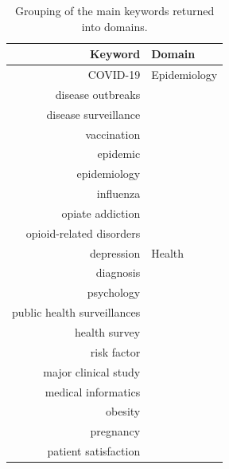 \begin{center}
    \begin{longtable}{rl}
        \caption{Grouping of the main keywords returned into domains.} \\
        Keyword                         & Domain                       \\
        \bottomrule
        COVID-19                        & Epidemiology                 \\
        disease outbreaks               &                              \\
        disease surveillance            &                              \\
        vaccination                     &                              \\
        epidemic                        &                              \\
        epidemiology                    &                              \\
        influenza                       &                              \\
        opiate addiction                &                              \\
        opioid-related disorders        &                              \\
        depression                      & Health                       \\
        diagnosis                       &                              \\
        psychology                      &                              \\
        public health surveillances     &                              \\
        health survey                   &                              \\
        risk factor                     &                              \\
        major clinical study            &                              \\
        medical informatics             &                              \\
        obesity                         &                              \\
        pregnancy                       &                              \\
        patient satisfaction            &                              \\

\end{longtable}
\end{center}
